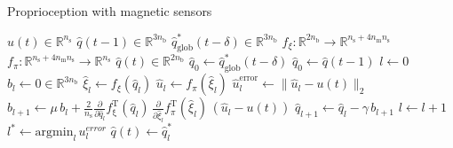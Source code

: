 \begin{algorithm}[hbt!]
\caption{Proprioception with magnetic sensors}\label{alg:proprioception}
\begin{algorithmic}
\REQUIRE $u(t) \in \mathbb{R}^{n_\mathrm{s}}$ 
\STATE  \hspace{7mm} $\hat{q}(t-1) \in \mathbb{R}^{3n_\mathrm{b}}$
\STATE  \hspace{7mm} $\hat{q}_\mathrm{glob}^*(t-\delta) \in \mathbb{R}^{3n_\mathrm{b}}$
\STATE  \hspace{7mm} $f_\xi: \mathbb{R}^{2n_\mathrm{b}} \rightarrow \mathbb{R}^{n_\mathrm{s} + 4n_\mathrm{m} n_\mathrm{s}}$ 
\STATE  \hspace{7mm} $f_\pi: \mathbb{R}^{n_\mathrm{s} + 4n_\mathrm{m} n_\mathrm{s}} \rightarrow \mathbb{R}^{n_\mathrm{s}}$ 
\ENSURE $\hat{q}(t) \in \mathbb{R}^{2n_\mathrm{b}}$ 
        \STATE $\hat{q}_0 \gets \hat{q}_\mathrm{glob}^*(t-\delta)$
    \ELSE
        \STATE $\hat{q}_0 \gets \hat{q}(t-1)$
    \ENDIF
    \vspace{0.25em}
    \STATE $l \gets 0$
    \STATE $b_l \gets 0 \in \mathbb{R}^{3n_\mathrm{b}}$
    \vspace{0.25em}
    \vspace{0.25em}
    \STATE $\hat{\xi}_l \gets f_{\xi}(\hat{q}_{l})$
    \vspace{0.25em}
    \STATE $\hat{u}_l \gets f_\pi(\hat{\xi}_l)$
    \vspace{0.25em}
    \STATE $\hat u_{l}^{\mathrm{error}} \gets \lVert \hat{u}_{l}-u(t) \rVert_2$
    \vspace{0.25em}
    \STATE $b_{l+1} \gets \mu \, b_l + \frac{2}{n_\mathrm{s}} \frac{\partial }{\partial {\hat{q}_l}} f_{\mathrm{\xi}}^\mathrm{T}(\hat{q}_l) \, \frac{\partial}{\partial {\hat{\xi}_l}} f_\pi^\mathrm{T}(\hat{\xi}_l) \, (\hat{u}_l - u(t))$
    \STATE $\hat{q}_{l+1} \gets \hat{q}_l - \gamma \, b_{l+1} $
    \vspace{0.25em}
    \STATE $l \gets l + 1$
\ENDWHILE
\STATE $l^* \gets \mathrm{argmin}_{l} \, u_{l}^{error}$
\STATE $\hat{q}(t) \gets \hat{q}_l^{*}$
\end{algorithmic}
\end{algorithm}

